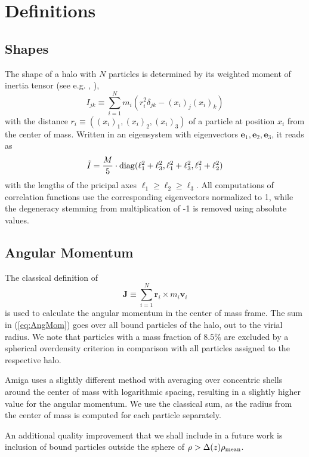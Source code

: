 \documentclass[useAMS,usenatbib]{mn2e}
\begin{document}
\section{Definitions}
\label{chap:defs}
%
\subsection{Shapes}
%
The shape of a halo with $N$ particles is determined by its weighted moment of
inertia tensor (see e.g. \cite{Hahn2007a}, \cite{Porciani2002a}),
%
\begin{equation} \label{eq:Idef}
  I_{jk}\equiv\sum_{i=1}^N m_i(r_i^2\delta_{jk}-(x_i)_j(x_i)_k)
\end{equation}
%
with the distance $r_i\equiv((x_i)_1,(x_i)_2,(x_i)_3)$ of a particle at
position $x_i$ from the center of mass. Written in an eigensystem with
eigenvectors $\mathbf{e}_1,\mathbf{e}_2,\mathbf{e}_3$, it reads as
%
\begin{equation} \label{eq:Ieigen}
  \tilde{I}=\frac{M}{5}\cdot\rm{diag}
  (\ell_1^2+\ell_3^2, \ell_1^2+\ell_3^2, \ell_1^2+\ell_2^2)
\end{equation}
%
with the lengths of the pricipal axes $\ell_1\geq\ell_2\geq\ell_3$. All
computations of correlation functions use the corresponding eigenvectors
normalized to 1, while the degeneracy stemming from multiplication of -1 is
removed using absolute values.
%
\subsection{Angular Momentum}
%
The classical definition of
%
\begin{equation} \label{eq:AngMom}
  \mathbf{J}\equiv\sum_{i=1}^N \mathbf{r}_i\times m_i\mathbf{v}_i
\end{equation}
%
is used to calculate the angular momentum in the center of mass frame. The sum
in (\ref{eq:AngMom}) goes over all bound particles of the halo, out to the
virial radius. We note that particles with a mass fraction of $8.5\%$ are
excluded by a spherical overdensity criterion in comparison with all particles
assigned to the respective halo.

{\sc Amiga} uses a slightly different method with averaging over concentric
shells around the center of mass with logarithmic spacing, resulting in a
slightly higher value for the angular momentum. We use the classical sum, as
the radius from the center of mass is computed for each particle separately.

An additional quality improvement that we shall include in a future work is
inclusion of bound particles outside the sphere of $\rho > \Delta(z)\rho_{\rm
  mean}$.
%
\end{document}
